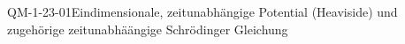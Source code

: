
\begin{CONC}{QM-1-23-01}{Eindimensionale, zeitunabhängige Potential (Heaviside) und zugehörige zeitunabhäängige Schrödinger Gleichung}
\end{CONC}
